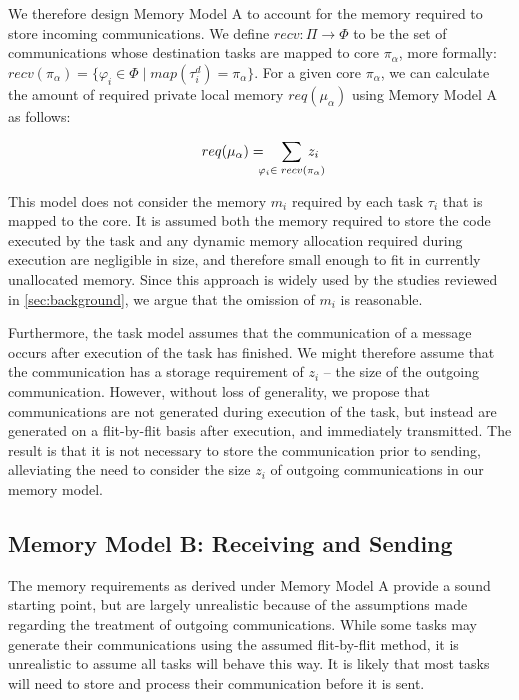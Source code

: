 \documentclass[10pt,conference]{IEEEtran}
\begin{document}
We therefore design Memory Model A to account for the memory required to store incoming communications. We define $recv : \Pi \rightarrow \Phi$ to be the set of communications whose destination tasks are mapped to core $\pi_\alpha$, more formally: $recv(\pi_\alpha) = \lbrace \varphi_i \in \Phi \mid map(\tau^d_i) = \pi_\alpha \rbrace$. For a given core $\pi_\alpha$, we can calculate the amount of required private local memory $req(\mu_\alpha)$ using Memory Model A as follows:

\vspace{-0.5ex}
\begin{equation}
  \label{eq:memory-model-a}
  req(\mu_\alpha) =
  \phantom{...} \sum_{\mathclap{\varphi_i \in \phantom{.}recv(\pi_\alpha)}}\phantom{.} z_i
\end{equation}

This model does not consider the memory $m_i$ required by each task $\tau_i$ that is mapped to the core. It is assumed both the memory required to store the code executed by the task and any dynamic memory allocation required during execution are negligible in size, and therefore small enough to fit in currently unallocated memory. Since this approach is widely used by the studies reviewed in \ref{sec:background}, we argue that the omission of $m_i$ is reasonable.

Furthermore, the task model assumes that the communication of a message occurs after execution of the task has finished. We might therefore assume that the communication has a storage requirement of $z_i$ -- the size of the outgoing communication. However, without loss of generality, we propose that communications are not generated during execution of the task, but instead are generated on a flit-by-flit basis after execution, and immediately transmitted. The result is that it is not necessary to store the communication prior to sending, alleviating the need to consider the size $z_i$ of outgoing communications in our memory model.

\subsection{Memory Model B: Receiving and Sending}\label{sec:memory-model-b}

The memory requirements as derived under Memory Model A provide a sound starting point, but are largely unrealistic because of the assumptions made regarding the treatment of outgoing communications. While some tasks may generate their communications using the assumed flit-by-flit method, it is unrealistic to assume all tasks will behave this way. It is likely that most tasks will need to store and process their communication before it is sent.
\end{document}
